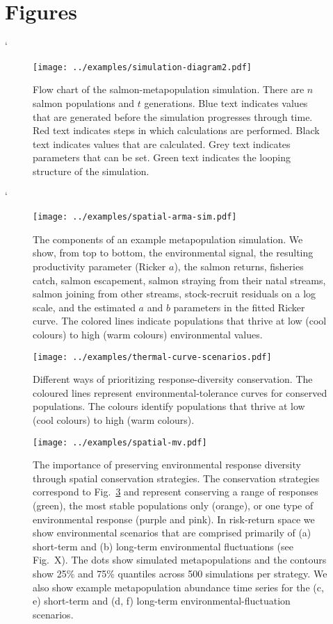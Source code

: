 \clearpage

\section{Figures}

`

\begin{figure}[htbp]
\centering
\texttt{[image: ../examples/simulation-diagram2.pdf]}
\caption{Flow chart of the salmon-metapopulation simulation. There are $n$ 
salmon populations and $t$ generations. Blue text indicates values that are 
generated before the simulation progresses through time. Red text indicates 
steps in which calculations are performed. Black text indicates values that are 
calculated. Grey text indicates parameters that can be set. Green text 
indicates the looping structure of the simulation.}
\label{f:sim-flow}
\end{figure}

`

\begin{figure}[htbp]
\centering
\texttt{[image: ../examples/spatial-arma-sim.pdf]}
\caption{The components of an example metapopulation simulation.  We show, from 
top to bottom, the environmental signal, the resulting productivity parameter 
(Ricker $a$), the salmon returns, fisheries catch, salmon escapement, salmon 
straying from their natal streams, salmon joining from other streams, 
stock-recruit residuals on a log scale, and the estimated $a$ and $b$ 
parameters in the fitted Ricker curve. The colored lines indicate populations 
that thrive at low (cool colours) to high (warm colours) environmental values.}
\label{f:sp-eg}
\end{figure}

\begin{figure}[htbp]
\centering
\texttt{[image: ../examples/thermal-curve-scenarios.pdf]}
\caption{Different ways of prioritizing response-diversity conservation. The 
coloured lines represent environmental-tolerance curves for conserved 
populations. The colours identify populations that thrive at low (cool colours) 
to high (warm colours).}
\label{f:curves}
\end{figure}

\begin{figure}[htbp]
\centering
\texttt{[image: ../examples/spatial-mv.pdf]}
\caption{The importance of preserving environmental response diversity through 
spatial conservation strategies. The conservation strategies correspond to 
Fig.~\ref{f:curves} and represent conserving a range of responses (green), the 
most stable populations only (orange), or one type of environmental response 
(purple and pink).  In risk-return space we show environmental scenarios that 
are comprised primarily of (a) short-term and (b) long-term environmental 
fluctuations (see Fig.~X). The dots show simulated metapopulations and the 
contours show 25\% and 75\% quantiles across 500 simulations per strategy. We 
also show example metapopulation abundance time series for the (c, e) 
short-term and (d, f) long-term  environmental-fluctuation scenarios.}
\label{f:sp-mv}
\end{figure}

